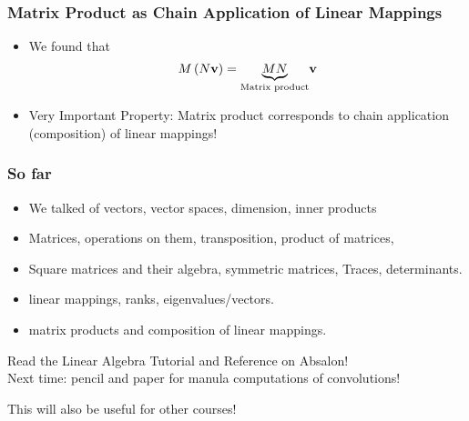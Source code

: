 \documentclass[8pt]{beamer}
\begin{document}
\begin{frame}
  \frametitle{Matrix Product as Chain Application of Linear Mappings}
  \begin{itemize}
  \item We found that 
    $$
    M\left (N{\bf v}\right) = \underset{\text{Matrix product}}{\underbrace{M N}}{\bf v}
    $$
  \item Very Important Property: Matrix product corresponds to chain application (composition) of linear mappings!
  \end{itemize}
\end{frame}

\begin{frame}
  \frametitle{So far}
  \begin{itemize}
  \item We talked of vectors, vector spaces, dimension, inner products
  \item Matrices, operations on them, transposition, product of matrices,
    \item Square matrices and their algebra, symmetric matrices, Traces, determinants.
    \item linear mappings, ranks, eigenvalues/vectors.
    \item matrix products and composition of linear mappings.
  \end{itemize}
\vfill
  \begin{center}
    \large
    Read the Linear Algebra Tutorial and Reference on Absalon!\\
    Next time: pencil and paper for manula computations of convolutions!
  \end{center}
  This will also be useful for other courses!
\end{frame}
\end{document}
